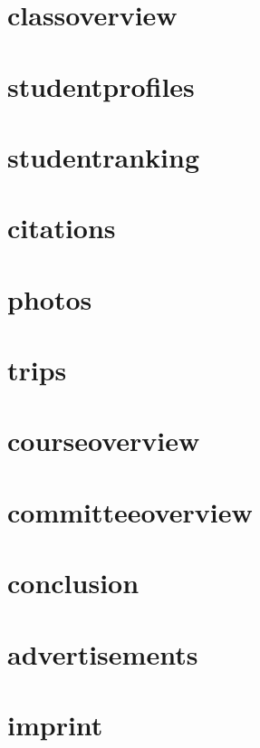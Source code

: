 \documentclass[a4paper, 13pt]{article}
\begin{document}
\part{classoverview}
\part{studentprofiles}
\part{studentranking}
\part{citations}
\part{photos}
\part{trips}
\part{courseoverview}
\part{committeeoverview}
\part{conclusion}
\part{advertisements}
\part{imprint}
\end{document}
